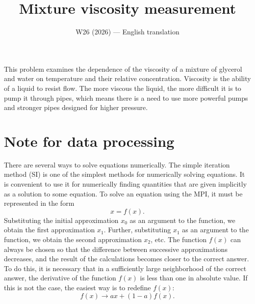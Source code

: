 \documentclass[11pt,a4paper]{article}
\title{\textbf{Mixture viscosity measurement}}
\author{\normalsize W26 (2026) --- English translation}
\date{}
\begin{document}
\maketitle

This problem examines the dependence of the viscosity of a mixture of glycerol and water on temperature and their relative concentration. Viscosity is the ability of a liquid to resist flow. The more viscous the liquid, the more difficult it is to pump it through pipes, which means there is a need to use more powerful pumps and stronger pipes designed for higher pressure.

\section*{Note for data processing}

There are several ways to solve equations numerically. The simple iteration method (SI) is one of the simplest methods for numerically solving equations. It is convenient to use it for numerically finding quantities that are given implicitly as a solution to some equation. To solve an equation using the MPI, it must be represented in the form 
\[x=f(x).\tag{1}\]
Substituting the initial approximation $x_0$ as an argument to the function, we obtain the first approximation $x_1$. Further, substituting $x_1$ as an argument to the function, we obtain the second approximation $x_2$, etc. The function $f(x)$ can always be chosen so that the difference between successive approximations decreases, and the result of the calculations becomes closer to the correct answer. To do this, it is necessary that in a sufficiently large neighborhood of the correct answer, the derivative of the function $f(x)$ is less than one in absolute value. If this is not the case, the easiest way is to redefine $f(x)$:
\[f(x)\to ax+(1-a)f(x).\] 
\end{document}
